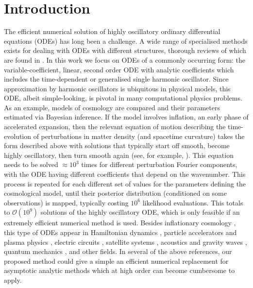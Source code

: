 \documentclass[10pt]{article}
\newcommand{\Fruzsi}[1]{{\color{blue}#1}}
\begin{document}
\section{Introduction}

The efficient numerical solution of highly oscillatory ordinary differential
equations (ODEs) has long been a challenge.
A wide range of specialised methods exists for dealing with ODEs
with different structures,
thorough reviews of which are found in
\cite{petzold1997,engquist2009}. 
In this work we focus on ODEs of a commonly occurring
form: the variable-coefficient, linear, second
order ODE with \Fruzsi{analytic} coefficients
which includes the time-dependent or generalised single harmonic oscillator.
Since approximation by harmonic oscillators is ubiquitous in physical models,
this ODE, albeit simple-looking, is pivotal in many computational physics problems.
As an example, models of cosmology are compared and their parameters estimated
via Bayesian inference. If the model involves inflation, an early phase of
accelerated expansion, then the relevant equation of motion describing the
time-evolution of perturbations in matter density (and spacetime curvature)
takes the form described above with solutions that typically start off smooth,
become highly oscillatory, then turn smooth again (see, for example,
\cite{agocs2020dense}). This equation needs to be solved $\approx 10^3$ times
for different perturbation Fourier components, with the ODE having different
coefficients that depend on the wavenumber. This process is repeated for each
different set of values for the parameters defining the cosmological model,
until their posterior distribution (conditioned on some observations) is
mapped, typically costing $10^6$ likelihood evaluations. This totals to
$\mathcal{O}(10^9)$ solutions of the highly oscillatory ODE, which is only
feasible if an extremely efficient numerical method is used.
Besides inflationary cosmology \cite{Hergt2022,martin2003,winitzki2005}, this type of ODEs appear in
Hamiltonian dynamics \cite{Pritula2018,fiore2022}, particle accelerators and plasma physics
\cite{courant1958,davidson2001,hazeltine2003,lewis1968}, electric circuits
\cite{likharev2022}, satellite systems \cite{saxena2020}, acoustics and gravity waves \cite{filippi1998,einaudi1970}, quantum mechanics \cite{griffiths2018,adhikari1988,arnold2011wkb,cea1982}, and other fields.
In several of the above references, our proposed method could give a simple an efficient numerical replacement for
asymptotic analytic methods which at high order can become cumbersome to apply.
  
\end{document}
